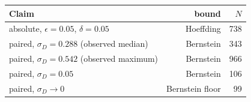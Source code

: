 \begin{tabular}{lrr}
\toprule
Claim & bound & $N$ \\
\midrule
absolute, $\epsilon=0.05$, $\delta=0.05$ & Hoeffding & 738 \\
paired, $\sigma_D=0.288$ (observed median) & Bernstein & 343 \\
paired, $\sigma_D=0.542$ (observed maximum) & Bernstein & 966 \\
paired, $\sigma_D=0.05$ & Bernstein & 106 \\
paired, $\sigma_D\to 0$ & Bernstein floor & 99 \\
\bottomrule
\end{tabular}

